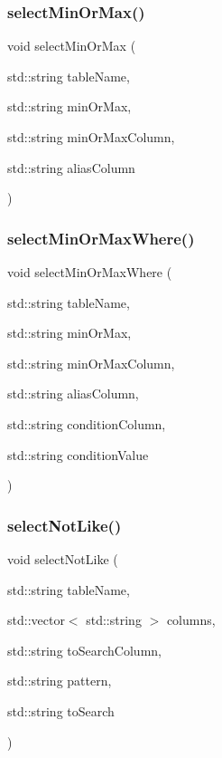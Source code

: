 \mbox{\label{sqllib_8hpp_ae4c9217024bfe521a229e0b4162e5ef7}} 
\subsubsection{select\+Min\+Or\+Max()}
{\footnotesize\ttfamily void select\+Min\+Or\+Max (\begin{DoxyParamCaption}\item[{std\+::string}]{table\+Name,  }\item[{std\+::string}]{min\+Or\+Max,  }\item[{std\+::string}]{min\+Or\+Max\+Column,  }\item[{std\+::string}]{alias\+Column }\end{DoxyParamCaption})}

\mbox{\label{sqllib_8hpp_a39f437d3c3c841e8a82b9ad1b514007e}} 
\subsubsection{select\+Min\+Or\+Max\+Where()}
{\footnotesize\ttfamily void select\+Min\+Or\+Max\+Where (\begin{DoxyParamCaption}\item[{std\+::string}]{table\+Name,  }\item[{std\+::string}]{min\+Or\+Max,  }\item[{std\+::string}]{min\+Or\+Max\+Column,  }\item[{std\+::string}]{alias\+Column,  }\item[{std\+::string}]{condition\+Column,  }\item[{std\+::string}]{condition\+Value }\end{DoxyParamCaption})}

\mbox{\label{sqllib_8hpp_aab8b32ae4ac6aeddc5c05578b4c79ace}} 
\subsubsection{select\+Not\+Like()}
{\footnotesize\ttfamily void select\+Not\+Like (\begin{DoxyParamCaption}\item[{std\+::string}]{table\+Name,  }\item[{std\+::vector$<$ std\+::string $>$}]{columns,  }\item[{std\+::string}]{to\+Search\+Column,  }\item[{std\+::string}]{pattern,  }\item[{std\+::string}]{to\+Search }\end{DoxyParamCaption})}

